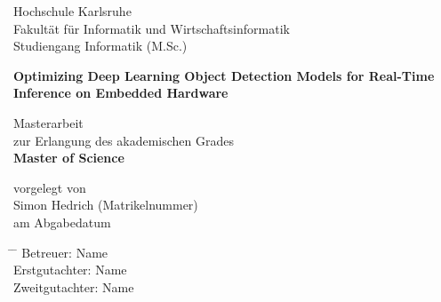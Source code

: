 \begin{titlepage}
    \begin{center}
        \Large
        Hochschule Karlsruhe\\
        Fakultät für Informatik und Wirtschaftsinformatik\\
        Studiengang Informatik (M.Sc.)\\
        \vspace{0.5cm}

        \Huge
        \textbf{Optimizing Deep Learning Object Detection Models for Real-Time Inference on Embedded Hardware}
        \vfill

        \LARGE
        Masterarbeit \\
        zur Erlangung des akademischen Grades\\
        \textbf{Master of Science}

        \vspace{0.8cm}
        vorgelegt von \\
        Simon Hedrich (Matrikelnummer)\\
        am Abgabedatum\\
    \end{center}

    \Large
    \vspace{1.75cm}
    \begin{tabbing}
    \hspace*{0.5cm}\= \hspace*{6cm} \= \kill
        \>Betreuer:\> Name\\
        \>Erstgutachter:\> Name \\
        \>Zweitgutachter:\> Name
    \end{tabbing}
\end{titlepage}
